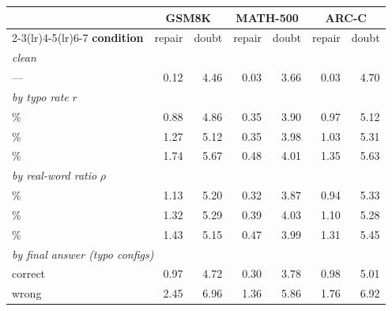 \begin{tabular}{l rr rr rr}
\toprule
& \multicolumn{2}{c}{\textbf{GSM8K}} & \multicolumn{2}{c}{\textbf{MATH-500}} & \multicolumn{2}{c}{\textbf{ARC-C}} \\
\cmidrule(lr){2-3}\cmidrule(lr){4-5}\cmidrule(lr){6-7}
\textbf{condition} & repair & doubt & repair & doubt & repair & doubt \\
\midrule
\multicolumn{7}{l}{\emph{clean}} \\
\quad --- & 0.12 & 4.46 & 0.03 & 3.66 & 0.03 & 4.70 \\
\midrule \multicolumn{7}{l}{\emph{by typo rate }$r$} \\
\quad 25\% & 0.88 & 4.86 & 0.35 & 3.90 & 0.97 & 5.12 \\
\quad 50\% & 1.27 & 5.12 & 0.35 & 3.98 & 1.03 & 5.31 \\
\quad 75\% & 1.74 & 5.67 & 0.48 & 4.01 & 1.35 & 5.63 \\
\midrule \multicolumn{7}{l}{\emph{by real-word ratio }$\rho$} \\
\quad 10\% & 1.13 & 5.20 & 0.32 & 3.87 & 0.94 & 5.33 \\
\quad 40\% & 1.32 & 5.29 & 0.39 & 4.03 & 1.10 & 5.28 \\
\quad 70\% & 1.43 & 5.15 & 0.47 & 3.99 & 1.31 & 5.45 \\
\midrule \multicolumn{7}{l}{\emph{by final answer (typo configs)}} \\
\quad correct & 0.97 & 4.72 & 0.30 & 3.78 & 0.98 & 5.01 \\
\quad wrong & 2.45 & 6.96 & 1.36 & 5.86 & 1.76 & 6.92 \\
\bottomrule
\end{tabular}
